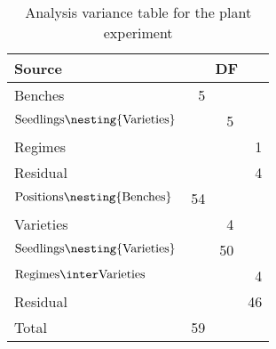 \begin{table}[htbp]
\begin{center}
\begin{tabular}{lrrr}
Source & \multicolumn {3}{c}{DF} \\
\hline
Benches & 5 \\
\quad $\mbox{Seedlings} \nesting{\mbox{Varieties}}$ & & 5          \\
\qquad Regimes   & & & 1  \\
\qquad Residual  & & & 4        \\
$\mbox{Positions}\nesting{\mbox{Benches}}$ & 54\\
\quad Varieties  & & 4  \\
\quad $\mbox{Seedlings} \nesting{\mbox{Varieties}}$ & & 50          \\
\qquad $\mbox{Regimes} \inter \mbox{Varieties}$   & & & 4  \\
\qquad Residual  & & & 46       \\
\hline
Total            & 59
\end{tabular}
\end{center}
\caption{Analysis variance table for the plant experiment}
\label{tab:ANOVAPlant}
\end{table}
